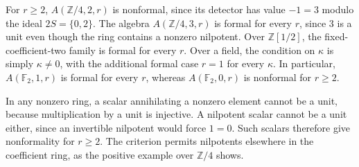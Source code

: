 For $r\geq2$, $A(\mathbb Z/4,2,r)$ is nonformal, since its detector
has value $-1=3$ modulo the ideal $2S=\{0,2\}$.
The algebra $A(\mathbb Z/4,3,r)$ is formal for every $r$, since
$3$ is a unit even though the ring contains a nonzero nilpotent.
Over $\mathbb Z[1/2]$, the fixed-coefficient-two family is formal
for every $r$.
Over a field, the condition on $\kappa$ is simply $\kappa\ne0$,
with the additional formal case $r=1$ for every $\kappa$.
In particular, $A(\mathbb F_2,1,r)$ is formal for every $r$,
whereas $A(\mathbb F_2,0,r)$ is nonformal for $r\geq2$.

In any nonzero ring, a scalar annihilating a nonzero element cannot
be a unit, because multiplication by a unit is injective.
A nilpotent scalar cannot be a unit either, since an invertible
nilpotent would force $1=0$.
Such scalars therefore give nonformality for $r\geq2$.
The criterion permits nilpotents elsewhere in the coefficient ring,
as the positive example over $\mathbb Z/4$ shows.
